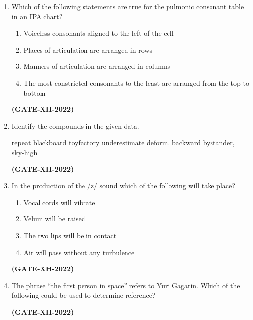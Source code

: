 \documentclass[journal]{IEEEtran}
\begin{document}
\begin{enumerate}
\item Which of the following statements are true for the pulmonic consonant table in an IPA chart?
\begin{enumerate}
\item Voiceless consonants aligned to the left of the cell
\item Places of articulation are arranged in rows
\item Manners of articulation are arranged in columns
\item The most constricted consonants to the least are arranged from the top to bottom
\end{enumerate}
\hfill\textbf{(GATE-XH-2022)}

\item Identify the compounds in the given data.
\begin{multicols}{5}
    repeat blackboard toyfactory underestimate deform, backward bystander, sky-high
\end{multicols}
\begin{enumerate}
\end{enumerate}
\hfill\textbf{(GATE-XH-2022)}

\item In the production of the /z/ sound which of the following will take place?
\begin{enumerate}
\item Vocal cords will vibrate
\item Velum will be raised
\item The two lips will be in contact
\item Air will pass without any turbulence
\end{enumerate}
\hfill\textbf{(GATE-XH-2022)}

\item The phrase “the first person in space” refers to Yuri Gagarin. Which of the following could be used to determine reference?
\begin{enumerate}
\end{enumerate}
\hfill\textbf{(GATE-XH-2022)}


\end{enumerate}
\end{document}
